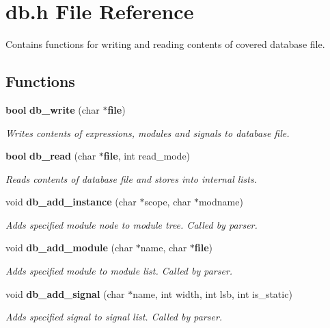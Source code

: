 \section{db.h File Reference}
\label{db_8h}
Contains functions for writing and reading contents of covered database file. 


\subsection*{Functions}
\begin{CompactItemize}
\item 
{\bf bool} {\bf db\_\-write} (char $\ast${\bf file})
\begin{CompactList}\small\item\em Writes contents of expressions, modules and signals to database file.\item\end{CompactList}\item 
{\bf bool} {\bf db\_\-read} (char $\ast${\bf file}, int read\_\-mode)
\begin{CompactList}\small\item\em Reads contents of database file and stores into internal lists.\item\end{CompactList}\item 
void {\bf db\_\-add\_\-instance} (char $\ast$scope, char $\ast$modname)
\begin{CompactList}\small\item\em Adds specified module node to module tree. Called by parser.\item\end{CompactList}\item 
void {\bf db\_\-add\_\-module} (char $\ast$name, char $\ast${\bf file})
\begin{CompactList}\small\item\em Adds specified module to module list. Called by parser.\item\end{CompactList}\item 
void {\bf db\_\-add\_\-signal} (char $\ast$name, int width, int lsb, int is\_\-static)
\begin{CompactList}\small\item\em Adds specified signal to signal list. Called by parser.\item\end{CompactList}\item 

\end{CompactItemize}
